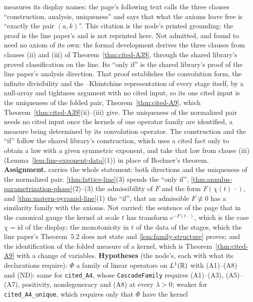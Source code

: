 \begin{theorem}
{measures its display names: the page's following text calls the three clauses ``construction,
analysis, uniqueness'' and says that what the axioms leave free is ``exactly the pair $(a,k)$''.
This citation is the node's printed grounding: the proof is the line paper's and is not reprinted
here. Not admitted, and found to need no axiom of its own: the formal development
derives the three clauses from clauses (ii) and (iii) of Theorem~\ref{thm:cited-A39}, through the shared
library's proved classification on the line. Its ``only if'' is the shared library's proof of the
line paper's analysis direction. That proof establishes the convolution form, the infinite
divisibility and the \Levy--Khintchine representation of every stage itself, by a null-array and
tightness argument with no cited input, so its one cited input is the uniqueness of the folded
pair, Theorem~\ref{thm:cited-A9}, which Theorem~\ref{thm:cited-A39}(ii)--(iii) give. The uniqueness of the
normalized pair needs no cited input once the kernels of one operator family are identified, a
measure being determined by its convolution operator. The construction and the ``if'' follow the shared library's construction,
which uses a cited fact only to obtain a law with a given symmetric exponent, and take that law from
clause (iii) (Lemma~\ref{lem:line-exponent-data}(1)) in place of Bochner's theorem.
\textbf{Assignment.}  carries the whole statement: both directions and the uniqueness of
the normalized pair. \ref{thm:lattice-line}(3) spends the ``only if'',
\ref{thm:annulus-parametrization-phase}(2)--(3) the admissibility of $F$ and the form
$F(\chi(t)\,\cdot)$, and \ref{thm:matern-pyramid-line}(1) the ``if'', that an admissible
$F \not\equiv 0$ has a similarity family with the axioms. Not carried: the sentence of the page
that in the canonical gauge the kernel at scale $t$ has transform $e^{-F(t\,\cdot)}$, which is the
case $\chi = \mathrm{id}$ of the display; the monotonicity in $t$ of the data of the stages, which
the line paper's Theorem~5.2 does not state and \ref{lem:family-structure} proves; and the
identification of the folded \Levy{} measure of a kernel, which is Theorem~\ref{thm:cited-A9} with a change
of variables.
\textbf{Hypotheses} (the node's, each with what its declarations require): $\Phi$ a family of linear
operators on $L^1(\mathbb{R})$ with (A1)--(A8) and (ND): same for \texttt{cited\_A4}, whose
\texttt{CascadeFamily} requires (A1)--(A3), (A5)--(A7), positivity, nondegeneracy and (A8) at every
$\lambda > 0$; weaker for \texttt{cited\_A4\_unique}, which requires only that $\Phi$ have the kernel
}
\end{theorem}
